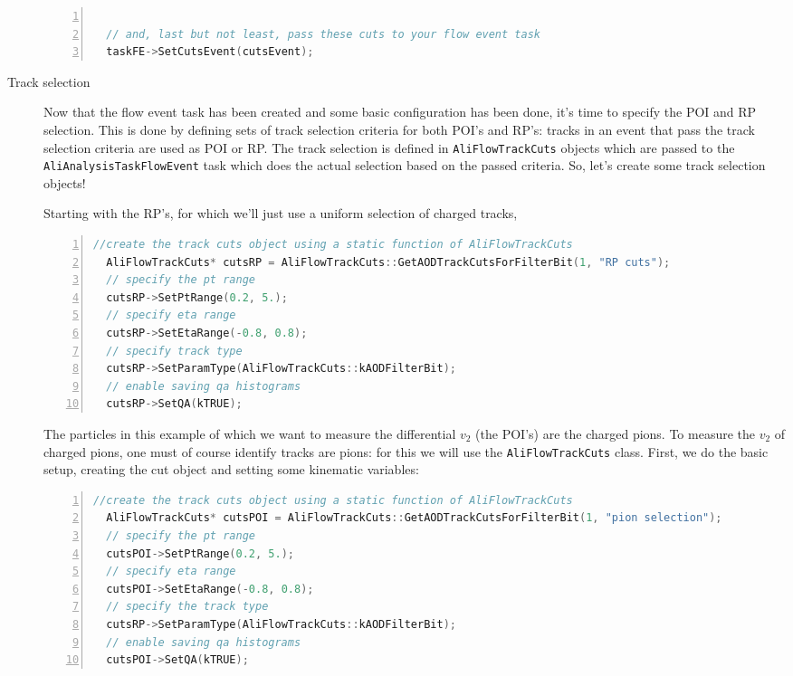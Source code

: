 \documentclass[a4paper]{book}
\numberwithin{equation}{subsection}
\begin{document}
\begin{description}
\begin{lstlisting}[language=C, numbers=left]
  
  // and, last but not least, pass these cuts to your flow event task
  taskFE->SetCutsEvent(cutsEvent);\end{lstlisting}

\item [Track selection]
Now that the flow event task has been created and some basic configuration has been done, it's time to specify the POI and RP selection. This is done by defining sets of track selection criteria for both POI's and RP's: tracks in an event that pass the track selection criteria are used as POI or RP. The track selection is defined in \texttt{AliFlowTrackCuts} objects which are passed to the \texttt{AliAnalysisTaskFlowEvent} task which does the actual selection based on the passed criteria. So, let's create some track selection objects!

Starting with the RP's, for which we'll just use a uniform selection of charged tracks,
\begin{lstlisting}[language=C, numbers=left]
  //create the track cuts object using a static function of AliFlowTrackCuts
  AliFlowTrackCuts* cutsRP = AliFlowTrackCuts::GetAODTrackCutsForFilterBit(1, "RP cuts");
  // specify the pt range
  cutsRP->SetPtRange(0.2, 5.);
  // specify eta range
  cutsRP->SetEtaRange(-0.8, 0.8);
  // specify track type
  cutsRP->SetParamType(AliFlowTrackCuts::kAODFilterBit);
  // enable saving qa histograms
  cutsRP->SetQA(kTRUE);\end{lstlisting}
  
The particles in this example of which we want to measure the differential $v_2$ (the POI's) are the charged pions. To measure the $v_2$ of charged pions, one must of course identify tracks are pions: for this we will use the \texttt{AliFlowTrackCuts} class. First, we do the basic setup, creating the cut object and setting some kinematic variables:
  
\begin{lstlisting}[language=C, numbers=left]
  //create the track cuts object using a static function of AliFlowTrackCuts
  AliFlowTrackCuts* cutsPOI = AliFlowTrackCuts::GetAODTrackCutsForFilterBit(1, "pion selection");
  // specify the pt range
  cutsPOI->SetPtRange(0.2, 5.);
  // specify eta range
  cutsPOI->SetEtaRange(-0.8, 0.8);
  // specify the track type
  cutsRP->SetParamType(AliFlowTrackCuts::kAODFilterBit);
  // enable saving qa histograms
  cutsPOI->SetQA(kTRUE);\end{lstlisting}


\end{description}
\end{document}
